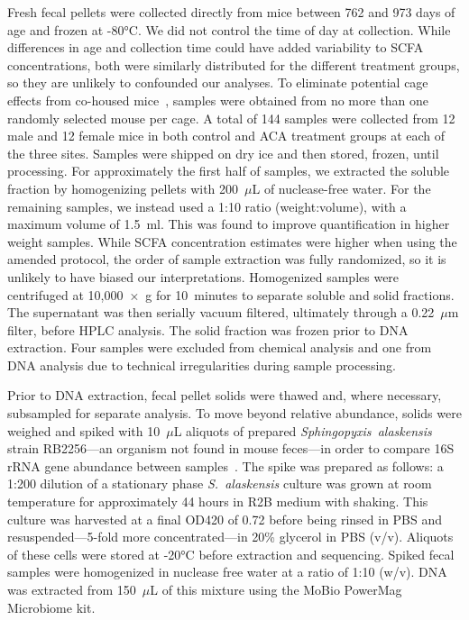 \documentclass{doc/template/bmcart-nofigbox}
\newcommand{\frnlang}[1]{\textit{#1}}
\newcommand{\taxon}[1]{\frnlang{#1}}
\begin{document}
Fresh fecal pellets were collected directly from mice between 762 and 973 days
of age and frozen at -80°C.
We did not control the time of day at collection.
While differences in age and collection time could have added variability to
SCFA concentrations, both were similarly distributed for the different
treatment groups, so they are unlikely to confounded our analyses.
To eliminate potential cage effects from co-housed mice~\cite{Laukens2015},
samples were obtained from no more than one randomly selected mouse per cage.
A total of 144 samples were collected from 12 male and 12 female mice in both
control and ACA treatment groups at each of the three sites.
Samples were shipped on dry ice and then stored, frozen, until processing.
For approximately the first half of samples, we extracted the soluble fraction
by homogenizing pellets with 200~$\mu$L of nuclease-free water.
For the remaining samples, we instead used a 1:10 ratio (weight:volume), with a
maximum volume of 1.5~ml.
This was found to improve quantification in higher weight samples.
While SCFA concentration estimates were higher when using the amended protocol,
the order of sample extraction was fully randomized, so it is unlikely to have
biased our interpretations.
Homogenized samples were centrifuged at 10,000~×~g for 10~minutes to
separate soluble and solid fractions.
The supernatant was then serially vacuum filtered, ultimately through a
0.22~$\mu$m filter, before HPLC analysis.
The solid fraction was frozen prior to DNA extraction.
Four samples were excluded from chemical analysis and one from DNA analysis due
to technical irregularities during sample processing.

Prior to DNA extraction, fecal pellet solids were thawed and, where
necessary, subsampled for separate analysis.
To move beyond relative abundance, solids were weighed and
spiked with 10~$\mu$L aliquots of prepared \taxon{Sphingopyxis~alaskensis} strain
RB2256---an organism not found in mouse feces---in order to compare
16S rRNA gene abundance between samples~\cite{Smets2016, Stammler2016}.
The spike was prepared as follows:
a 1:200 dilution of a stationary phase \taxon{S.~alaskensis} culture was grown at
room temperature for approximately 44 hours in R2B medium with shaking.
This culture was harvested at a final OD420 of 0.72 before being rinsed in PBS
and resuspended---5-fold more concentrated---in 20\% glycerol in
PBS (v/v).
Aliquots of these cells were stored at -20°C before extraction and
sequencing.
Spiked fecal samples were homogenized in nuclease free water at a ratio of
1:10 (w/v).
DNA was extracted from 150~$\mu$L of this mixture using the MoBio PowerMag
Microbiome kit.
\end{document}
